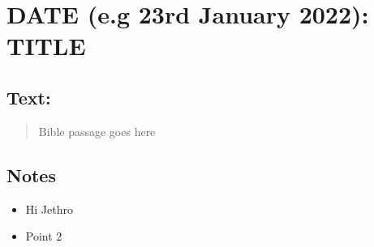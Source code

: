 \setcounter{figure}{0}

\section{DATE (e.g 23rd January 2022): TITLE}
\subsection*{Text: }
  \begin{quote}
    Bible passage goes here
  \end{quote}
\subsection*{Notes}
\begin{itemize}
  \item{Hi Jethro}
  \item{Point 2}
\end{itemize}